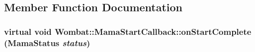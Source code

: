 \subsection{Member Function Documentation}
\hypertarget{classWombat_1_1MamaStartCallback_ab8fceb926edc9c4306b559ebe290925f}{
\subsubsection[{onStartComplete}]{\setlength{\rightskip}{0pt plus 5cm}virtual void Wombat::MamaStartCallback::onStartComplete ({\bf MamaStatus} {\em status})}}
\label{classWombat_1_1MamaStartCallback_ab8fceb926edc9c4306b559ebe290925f}

